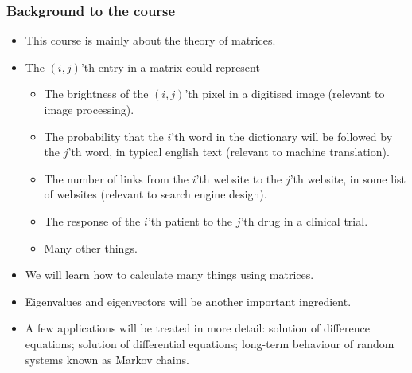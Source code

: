 \documentclass[9pt]{beamer}
\begin{document}
\begin{frame}[t]
 \frametitle{Background to the course}
 \begin{itemize}
  \item<1-> This course is mainly about the theory of matrices.
  \item<2-> The $(i,j)$'th entry in a matrix could represent
   \begin{itemize}
   \item<3-> The brightness of the $(i,j)$'th pixel in a digitised
     image (relevant to image processing).
    \item<4-> The probability that the $i$'th word in the dictionary
     will be followed by the $j$'th word, in typical english text
     (relevant to machine translation).
    \item<5-> The number of links from the $i$'th website to the $j$'th
     website, in some list of websites (relevant to search engine
     design).
    \item<6-> The response of the $i$'th patient to the $j$'th drug in
     a clinical trial.
    \item<7-> Many other things.
   \end{itemize}
  \item<8-> We will learn how to calculate many things using
   matrices.    
  \item<12-> Eigenvalues and eigenvectors will be another important
   ingredient.
  \item<13-> A few applications will be treated in more detail:
   solution of difference equations; solution of differential
   equations; long-term behaviour of random systems known as Markov
   chains. 
 \end{itemize}
\end{frame}
\end{document}
